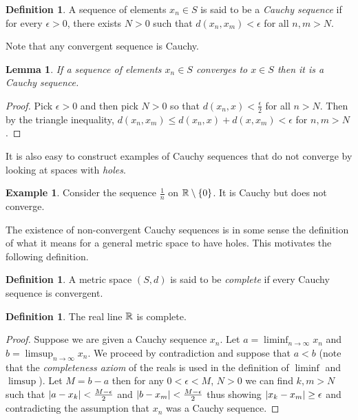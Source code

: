 \documentclass{amsart}
\newtheorem{lem}[thm]{Lemma}
\theoremstyle{remark}
\theoremstyle{definition}
\newtheorem{defn}[thm]{Definition}
\newtheorem{examp}[thm]{Example}
\begin{document}
\begin{defn}A sequence of elements $x_n \in S$ is said to be a
  \emph{Cauchy sequence}
  if for every $\epsilon > 0$, there exists $N > 0$ such that
  $d(x_n,x_m) < \epsilon$ for all $n,m > N$.
\end{defn}
Note that any convergent sequence is Cauchy.
\begin{lem}If a sequence of elements $x_n \in S$ converges to $x \in
  S$ then it is a Cauchy sequence.
\end{lem}
\begin{proof}Pick $\epsilon > 0$ and then pick $N>0$ so that $d(x_n,x)
  < \frac{\epsilon}{2}$ for all $n > N$.  Then by the triangle
  inequality, $d(x_n, x_m) \leq d(x_n, x) + d(x, x_m) < \epsilon$ for
  $n,m > N$.
\end{proof}
It is also easy to construct examples of Cauchy sequences that do not
converge by looking at spaces with \emph{holes}.
\begin{examp}Consider the sequence $\frac{1}{n}$ on $\mathbb{R} \setminus
  \lbrace 0 \rbrace$.  It is Cauchy but does not converge.
\end{examp}
The existence of non-convergent Cauchy sequences is in some sense the
definition of what it means for a general metric space to have holes.
This motivates the following definition.
\begin{defn}A metric space $(S,d)$ is said to be \emph{complete} if
  every Cauchy sequence is convergent.
\end{defn}
\begin{defn}The real line $\mathbb{R}$ is complete.
\end{defn}
\begin{proof}Suppose we are given a Cauchy sequence $x_n$.  Let $a =
  \liminf_{n \to \infty} x_n$ and $b = \limsup_{n \to \infty} x_n $.
  We proceed by contradiction and suppose
  that $a < b$ (note
  that the \emph{completeness axiom} of the reals is used in the
  definition of $\liminf$ and $\limsup$).  Let $M =b-a$ then for any
  $0 < \epsilon < M$, $N>0$
  we can find $k,m > N$ such that $\left \vert a - x_k \right \vert < \frac{M -
    \epsilon}{2}$ and $\left \vert b - x_m \right \vert < \frac{M -
    \epsilon}{2}$ thus showing $\left \vert x_k - x_m \right \vert \geq \epsilon$ and
  contradicting the assumption that $x_n$ was a Cauchy sequence.
\end{proof}
\end{document}
